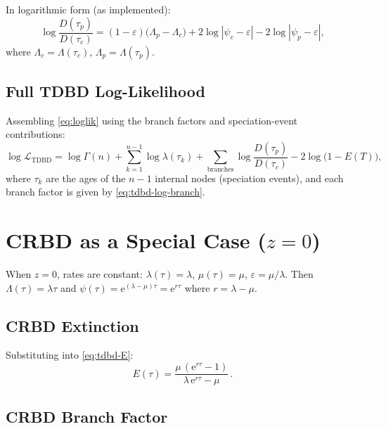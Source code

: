 \documentclass[11pt,a4paper]{article}
\newcommand{\ee}{\mathrm{e}}
\newcommand{\eps}{\varepsilon}
\newcommand{\Lam}{\Lambda}
\theoremstyle{plain}
\theoremstyle{definition}
\theoremstyle{remark}
\begin{document}
In logarithmic form (as implemented):
\begin{equation}\label{eq:tdbd-log-branch}
  \log\frac{D(\tau_p)}{D(\tau_c)}
  = (1-\eps)\bigl(\Lam_p - \Lam_c\bigr) + 2\log|\psi_c - \eps| - 2\log|\psi_p - \eps|,
\end{equation}
where $\Lam_c = \Lam(\tau_c)$, $\Lam_p = \Lam(\tau_p)$.

\subsection{Full TDBD Log-Likelihood}

Assembling \eqref{eq:loglik} using the branch factors and speciation-event contributions:
\begin{equation}\label{eq:tdbd-loglik}
  \log\mathcal{L}_{\text{TDBD}}
  = \log\Gamma(n)
  + \sum_{k=1}^{n-1} \log\lambda(\tau_k)
  + \sum_{\text{branches}} \log\frac{D(\tau_p)}{D(\tau_c)}
  - 2\log\!\bigl(1 - E(T)\bigr),
\end{equation}
where $\tau_k$ are the ages of the $n-1$ internal nodes (speciation events), and each branch factor is given by \eqref{eq:tdbd-log-branch}.

\section{CRBD as a Special Case ($z = 0$)}
\label{sec:crbd}

When $z = 0$, rates are constant: $\lambda(\tau) = \lambda$, $\mu(\tau) = \mu$, $\eps = \mu/\lambda$.
Then $\Lam(\tau) = \lambda\tau$ and $\psi(\tau) = \ee^{(\lambda - \mu)\tau} = \ee^{r\tau}$ where $r = \lambda - \mu$.

\subsection{CRBD Extinction}

Substituting into \eqref{eq:tdbd-E}:
\begin{equation}\label{eq:crbd-E}
  E(\tau) = \frac{\mu\,(\ee^{r\tau} - 1)}{\lambda\,\ee^{r\tau} - \mu}\,.
\end{equation}

\subsection{CRBD Branch Factor}
\end{document}
